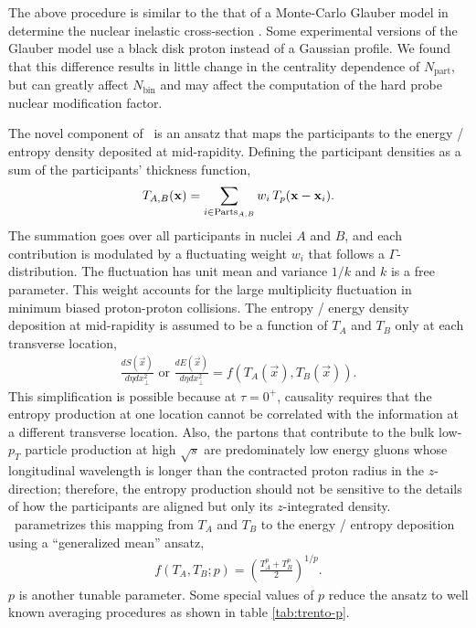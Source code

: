 The above procedure is similar to the that of a Monte-Carlo Glauber model in determine the nuclear inelastic cross-section \cite{Miller:2007ri}.
Some experimental versions of the Glauber model use a black disk proton instead of a Gaussian profile.
We found that this difference results in little change in the centrality dependence of $N_{\textrm{part}}$, but can greatly affect $N_{\textrm{bin}}$ and may affect the computation of the hard probe nuclear modification factor.

The novel component of \trento\ is an ansatz that maps the participants to the energy / entropy density deposited at mid-rapidity.
Defining the participant densities as a sum of the participants' thickness function,
\begin{equation}
T_{A, B}(\mathbf x) = \sum_{i\in \textrm{Parts}_{A, B}} w_i\, T_p(\mathbf x - \mathbf x_i).
\end{equation}
The summation goes over all participants in nuclei $A$ and $B$, and each contribution is modulated by a fluctuating weight $w_i$ that follows a $\Gamma$-distribution.
The fluctuation has unit mean and variance $1/k$ and $k$ is a free parameter.
This weight accounts for the large multiplicity fluctuation in minimum biased proton-proton collisions.
The entropy / energy density deposition at mid-rapidity is assumed to be a function of $T_A$ and $T_B$ only at each transverse location,
\begin{eqnarray}
\frac{dS(\vec{x})}{d\eta dx_\perp^2} \textrm{ or } \frac{dE(\vec{x})}{d\eta dx_\perp^2} = f(T_A(\vec{x}), T_B(\vec{x})).
\end{eqnarray}
This simplification is possible because at $\tau=0^+$, causality requires that the entropy production at one location cannot be correlated with the information at a different transverse location. 
Also, the partons that contribute to the bulk low-$p_T$ particle production at high $\sqrt{s}$ are predominately low energy gluons whose longitudinal wavelength is longer than the contracted proton radius in the $z$-direction; therefore, the entropy production should not be sensitive to the details of how the participants are aligned but only its $z$-integrated density.
\trento\ parametrizes this mapping from $T_A$ and $T_B$ to the energy / entropy deposition using a ``generalized mean'' ansatz,
\begin{eqnarray}
f(T_A, T_B; p) = \left(\frac{T_A^p + T_B^p}{2}\right)^{1/p}.
\end{eqnarray}
$p$ is another tunable parameter.
Some special values of $p$ reduce the ansatz to well known averaging procedures as shown in table \ref{tab:trento-p}.
